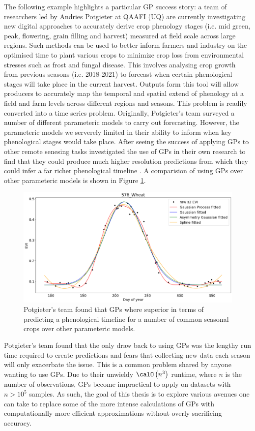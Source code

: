 The following example highlights a particular GP success story: a team of researchers led by Andries Potgieter at QAAFI (UQ) are currently investigating new digital approaches to accurately derive crop phenology stages (i.e. mid green, peak, flowering, grain filling and harvest) measured at field scale across large regions. Such methods can be used to better inform farmers and industry on the optimised time to plant various crops to minimize crop loss from environmental stresses such as frost and fungal disease. This involves analysing crop growth from previous seasons (i.e. 2018-2021) to forecast when certain phenological stages will take place in the current harvest. Outputs form this tool will allow producers to accurately map the temporal and spatial extend of phenology at a field and farm levels across different regions and seasons. This problem is readily converted into a time series problem. Originally, Potgieter's team surveyed a number of different parameteric models to carry out forecasting. However, the parameteric models we serverely limited in their ability to inform when key phenological stages would take place. After seeing the success of applying GPs to other remote senesing tasks \cite{rs14010146} investigated the use of GPs in their own research to find that they could produce much higher resolution predictions from which they could infer a far richer phenological timeline \cite{potg2013}. A comparision of using GPs over other parameteric models is shown in Figure \ref{fig: GP_motivate_wheat}.
\begin{figure}[ht]
    \centering
    \includegraphics[scale=0.3]{img/yan_wheat_GPR_plot.png}
    \caption{Potgieter's team found that GPs where superior in terms of predicting a phenological timeline for a number of common seasonal crops over other parameteric models.}
    \label{fig: GP_motivate_wheat}
\end{figure}
Potgieter's team found that the only draw back to using GPs was the lengthy run time required to create predictions and fears that collecting new data each season will only exacerbate the issue. This is a common problem shared by anyone wanting to use GPs. Due to their unwieldy $\calO \left( n^3 \right)$ runtime, where $n$ is the number of observations, GPs become impractical to apply on datasets with $n > 10^5$ samples. As such, the goal of this thesis is to explore various avenues one can take to replace some of the more intense calculations of GPs with computationally more efficient approximations without overly sacrificing accuracy.

